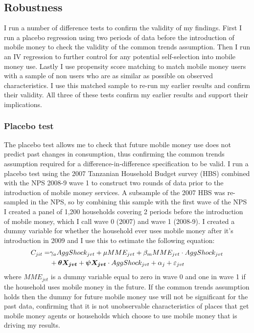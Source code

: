 
\subsection{Robustness}
I run a number of difference tests to confirm the validity of my findings. First I run a placebo regression using two periods of data before the introduction of mobile money to check the validity of the common trends assumption. Then I run an IV regression to further control for any potential self-selection into mobile money use. Lastly I use propensity score matching to match mobile money users with a sample of non users who are as similar as possible on observed characteristics. I use this matched sample to re-run my earlier results and  confirm their validity. All three of these tests confirm my earlier results and support their implications.   

\subsubsection{Placebo test}
The placebo test allows me to check that future mobile money use does not predict past changes in consumption, thus confirming the common trends assumption required for a difference-in-difference specification to be valid. I run a placebo test using the 2007 Tanzanian Household Budget survey (HBS) combined with the NPS 2008-9 wave 1  to construct two rounds of data prior to the introduction of mobile money services. A subsample of the 2007 HBS was re-sampled in the NPS, so by combining this sample with the first wave of the NPS I created a panel of 1,200 households covering 2 periods before the introduction of mobile money, which I call wave 0 (2007) and wave 1 (2008-9). I created a dummy variable for whether the household ever uses mobile money after it's introduction in 2009 and I use this to estimate the following equation: 
\begin{align} \label{eq: placebo}
C_{jit} = &  \gamma_a AggShock_{jvt} + \mu MME_{jvt}      + \beta_m MME_{jvt}\cdot AggShock_{jvt}  \notag \\
& + \bm{\theta X_{jvt}} +  \bm{\psi X_{jvt}} \cdot AggShock_{jvt} +  \alpha_j + \varepsilon_{jvt} 
\end{align}
where $MME_{jvt}$ is a dummy variable equal to zero in wave 0 and one in wave 1 if the household uses mobile money in the future. If the common trends assumption holds then the dummy for future mobile money use will not be significant for the past data, confirming that it is not unobservable characteristics of places that get mobile money agents or households which choose to use mobile money that is driving my results. 

